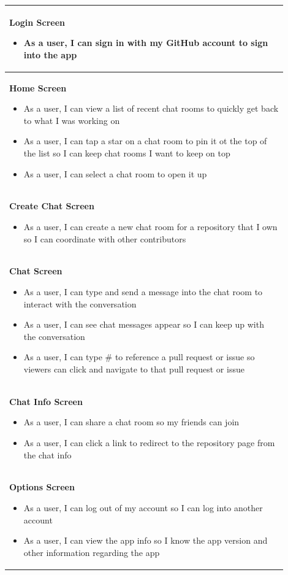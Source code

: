 \documentclass{report}
\begin{document}
\begin{center}
    \begin{tabular}{ | p{0.9\linewidth} |}
        \hline
        \textbf{Login Screen} \begin{itemize}
            \item As a user, I can sign in with my GitHub account to sign into the app
        \end{itemize}\\
        \hline
        \textbf{Home Screen} \begin{itemize}
            \item As a user, I can view a list of recent chat rooms to quickly get back to what I was working on
            \item As a user, I can tap a star on a chat room to pin it ot the top of the list so I can keep chat rooms I want to keep on top
            \item As a user, I can select a chat room to open it up
        \end{itemize}\\
        \hline
        \textbf{Create Chat Screen}\begin{itemize}
            \item As a user, I can create a new chat room for a repository that I own so I can coordinate with other contributors
        \end{itemize}\\
        \hline
        \textbf{Chat Screen}\begin{itemize}
            \item As a user, I can type and send a message into the chat room to interact with the conversation
            \item As a user, I can see chat messages appear so I can keep up with the conversation
            \item As a user, I can type \# to reference a pull request or issue so viewers can click and navigate to that pull request or issue

        \end{itemize}\\
        \hline
        \textbf{Chat Info Screen}\begin{itemize}
            \item As a user, I can share a chat room so my friends can join
            \item As a user, I can click a link to redirect to the repository page from the chat info
        \end{itemize}\\
        \hline
        \textbf{Options Screen}\begin{itemize}
            \item As a user, I can log out of my account so I can log into another account
            \item As a user, I can view the app info so I know the app version and other information regarding the app

        \end{itemize}\\
        \hline
    \end{tabular}
\end{center}
\end{document}
